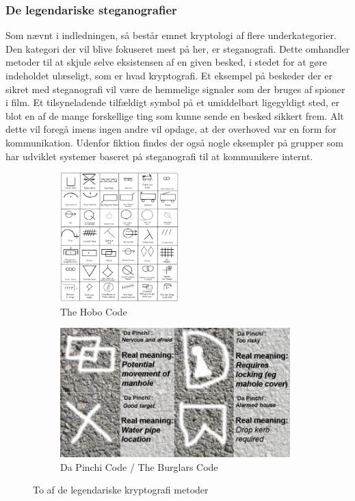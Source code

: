 \subsubsection{De legendariske steganografier}
Som nævnt i indledningen, så består emnet kryptologi af flere underkategorier. Den kategori der vil blive fokuseret mest på her, er steganografi. Dette omhandler metoder til at skjule selve eksistensen af en given besked, i stedet for at gøre indeholdet ulæseligt, som er hvad kryptografi.\cite{MeningOfSteganografi} Et eksempel på beskeder der er sikret med steganografi vil være de hemmelige signaler som der bruges af spioner i film. Et tilsyneladende tilfældigt symbol på et umiddelbart ligegyldigt sted, er blot en af de mange forskellige ting som kunne sende en besked sikkert frem. Alt dette vil foregå imens ingen andre vil opdage, at der overhoved var en form for kommunikation. Udenfor fiktion findes der også nogle eksempler på grupper som har udviklet systemer baseret på steganografi til at kommunikere internt.
\begin{figure}[H]
    \begin{subfigure}{0.5\textwidth}
    \includegraphics[width=0.9\linewidth, height=5cm]{Projectdoc/Problemanalyse/Illustrationer/hobo-glyphs-code.jpg} 
    \caption{The Hobo Code}
    \label{fig:hobocode}
    \end{subfigure}
    \begin{subfigure}{0.5\textwidth}
    \includegraphics[width=0.9\linewidth, height=5cm]{Projectdoc/Problemanalyse/Illustrationer/BurglarsCode.jpg}
    \caption{Da Pinchi Code / The Burglars Code}
    \label{fig:burglarscode}
    \end{subfigure}
    \caption{To af de legendariske kryptografi metoder}
    \label{fig:legendscode}
\end{figure}

